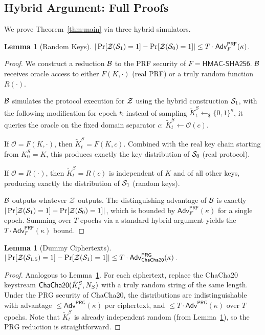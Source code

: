 \documentclass[letterpaper,twocolumn,10pt]{article}
\newtheorem{lemma}[theorem]{Lemma}
\theoremstyle{definition}
\newcommand{\sample}{\leftarrow_{\$}}\newcommand{\concat}{\|}
\begin{document}
\subsection{Hybrid Argument: Full Proofs}

We prove Theorem~\ref{thm:main} via three hybrid simulators.

\begin{lemma}[Random Keys]\label{lem:hyb1-full}
$|\Pr[\mathcal{Z}(\mathcal{S}_1)=1] - \Pr[\mathcal{Z}(\mathcal{S}_0)=1]| \leq T \cdot
\mathsf{Adv}^{\mathsf{PRF}}_{F}(\kappa)$.
\end{lemma}

\begin{proof}
We construct a reduction $\mathcal{B}$ to the PRF security of
$F = \mathsf{HMAC\text{-}SHA256}$. $\mathcal{B}$ receives oracle access to either
$F(K, \cdot)$ (real PRF) or a truly random function $R(\cdot)$.

$\mathcal{B}$ simulates the protocol execution for $\mathcal{Z}$ using the hybrid
construction $\mathcal{S}_1$, with the following modification for epoch $t$:
instead of sampling $\tilde{K}^S_t \sample \{0,1\}^\kappa$, it queries the
oracle on the fixed domain separator $c$: $\tilde{K}^S_t \leftarrow
\mathcal{O}(c)$.

If $\mathcal{O} = F(K, \cdot)$, then $\tilde{K}^S_t = F(K, c)$.
Combined with the real key chain starting from $K^S_0 = K$, this produces
exactly the key distribution of $\mathcal{S}_0$ (real protocol).

If $\mathcal{O} = R(\cdot)$, then $\tilde{K}^S_t = R(c)$ is independent
of $K$ and of all other keys, producing exactly the distribution of
$\mathcal{S}_1$ (random keys).

$\mathcal{B}$ outputs whatever $\mathcal{Z}$ outputs. The distinguishing advantage of
$\mathcal{B}$ is exactly $|\Pr[\mathcal{Z}(\mathcal{S}_1)=1] - \Pr[\mathcal{Z}(\mathcal{S}_0)=1]|$, which is
bounded by $\mathsf{Adv}^{\mathsf{PRF}}_{F}(\kappa)$ for a single epoch.
Summing over $T$ epochs via a standard hybrid argument yields the $T
\cdot \mathsf{Adv}^{\mathsf{PRF}}_{F}(\kappa)$ bound.
\end{proof}

\begin{lemma}[Dummy Ciphertexts]\label{lem:hyb2-full}
$|\Pr[\mathcal{Z}(\mathcal{S}_{1.5})=1] - \Pr[\mathcal{Z}(\mathcal{S}_1)=1]| \leq T \cdot
\mathsf{Adv}^{\mathsf{PRG}}_{\mathsf{ChaCha20}}(\kappa)$.
\end{lemma}

\begin{proof}
Analogous to Lemma~\ref{lem:hyb1-full}. For each ciphertext, replace the
ChaCha20 keystream $\mathsf{ChaCha20}(\tilde{K}^S_t, N_S)$ with a truly random
string of the same length. Under the PRG security of ChaCha20, the
distributions are indistinguishable with advantage $\leq
\mathsf{Adv}^{\mathsf{PRG}}(\kappa)$ per ciphertext, and $\leq T \cdot
\mathsf{Adv}^{\mathsf{PRG}}(\kappa)$ over $T$ epochs. Note that
$\tilde{K}^S_t$ is already independent random (from Lemma~\ref{lem:hyb1-full}),
so the PRG reduction is straightforward.
\end{proof}
\end{document}
